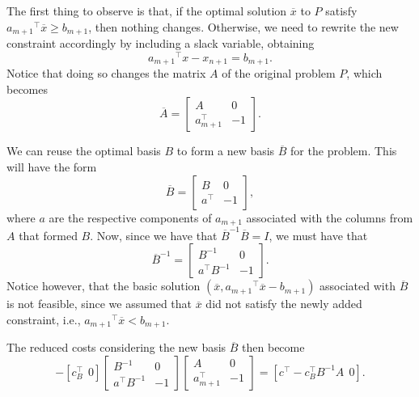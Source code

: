 The first thing to observe is that, if the optimal solution $\overline{x}$ to $P$ satisfy ${a_{m+1}}^\top \overline{x} \geq b_{m+1}$, then nothing changes. Otherwise, we need to rewrite the new constraint accordingly by including a slack variable, obtaining 
%
\begin{equation*}
	{a_{m+1}}^\top x - x_{n+1} = b_{m+1}.
\end{equation*}
%
Notice that doing so changes the matrix $A$ of the original problem $P$, which becomes
%
\begin{equation*}
	\overline{A} = \begin{bmatrix}
				   A & 0 \\ a^\top_{m+1} & -1 
				   \end{bmatrix}.
\end{equation*}

We can reuse the optimal basis $B$ to form a new basis $\overline{B}$ for the problem. This will have the form
%
\begin{equation*}
	\overline{B} = \begin{bmatrix}
		B & 0 \\ a^\top & -1 
	\end{bmatrix},	
\end{equation*}
%
where $a$ are the respective components of $a_{m+1}$ associated with the columns from $A$ that formed $B$. Now, since we have that $\overline{B}^{-1}\overline{B} = I$, we must have that 
%
\begin{equation*}
	\overline{B}^{-1} = \begin{bmatrix}
		B^{-1} & 0 \\ a^\top B^{-1} & -1 
	\end{bmatrix}.	
\end{equation*}
%
Notice however, that the basic solution $(\overline{x}, {a_{m+1}}^\top \overline{x} -  b_{m+1})$ associated with $\overline{B}$ is not feasible, since we assumed that $\overline{x}$ did not satisfy the newly added constraint, i.e., ${a_{m+1}}^\top \overline{x} < b_{m+1}$.

The reduced costs considering the new basis $\overline{B}$ then become
%
\begin{equation*}
	[c^\top ~~ 0] - [c_B^\top ~~ 0]\begin{bmatrix} B^{-1} & 0 \\ a^\top B^{-1} & -1 \end{bmatrix}\begin{bmatrix} A & 0 \\ a_{m+1}^\top & -1 \end{bmatrix} = [c^\top - c^\top_B B^{-1}A ~~ 0].
\end{equation*}
  	
